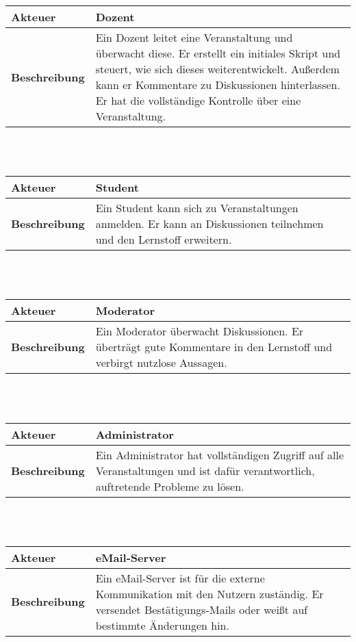 \documentclass[12pt,a4paper]{article}
\begin{document}
\begin{tabular}{l p{10cm}}
\textbf{Akteuer} & Dozent \\ 
\hline \textbf{Beschreibung} & Ein Dozent leitet eine Veranstaltung und überwacht diese. Er erstellt ein initiales Skript und steuert, wie sich dieses weiterentwickelt. Außerdem kann er Kommentare zu Diskussionen hinterlassen. Er hat die vollständige Kontrolle über eine Veranstaltung.\\ 
\hline 
\end{tabular}\\\\

\begin{tabular}{l p{10cm}}
\textbf{Akteuer} & Student \\ 
\hline \textbf{Beschreibung} & Ein Student kann sich zu Veranstaltungen anmelden. Er kann an Diskussionen teilnehmen und den Lernstoff erweitern.\\ 
\hline 
\end{tabular}\\\\

\begin{tabular}{l p{10cm}}
\textbf{Akteuer} & Moderator \\ 
\hline \textbf{Beschreibung} & Ein Moderator überwacht Diskussionen. Er überträgt gute Kommentare in den Lernstoff und verbirgt nutzlose Aussagen.\\ 
\hline 
\end{tabular}\\\\

\begin{tabular}{l p{10cm}}
\textbf{Akteuer} & Administrator \\ 
\hline \textbf{Beschreibung} & Ein Administrator hat vollständigen Zugriff auf alle Veranstaltungen und ist dafür verantwortlich, auftretende Probleme zu lösen. \\ 
\hline 
\end{tabular}\\\\

\begin{tabular}{l p{10cm}}
\textbf{Akteuer} & eMail-Server \\ 
\hline \textbf{Beschreibung} & Ein eMail-Server ist für die externe Kommunikation mit den Nutzern zuständig. Er versendet Bestätigungs-Mails oder weißt auf bestimmte Änderungen hin. \\ 
\hline 
\end{tabular}\\\\
\end{document}
